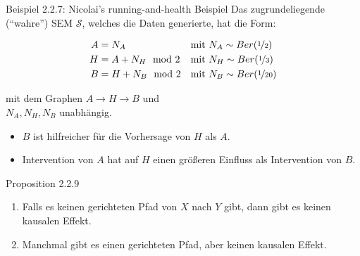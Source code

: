 \begin{frame}{Beispiel 2.2.7: Nicolai's running-and-health Beispiel}
    Das zugrundeliegende (\enquote{wahre}) SEM $\mathcal{S}$, welches die Daten
    generierte, hat die Form:

    \begin{align}
        A &= N_A            &&\text{mit } N_A \sim Ber(\nicefrac{1}{2})\\
        H &= A + N_H \mod 2 &&\text{mit } N_H \sim Ber(\nicefrac{1}{3})\\
        B &= H + N_B \mod 2 &&\text{mit } N_B \sim Ber(\nicefrac{1}{20})
    \end{align}

    mit dem Graphen $A \rightarrow H \rightarrow B$ und\\
    $N_A, N_H, N_B$ unabhängig.

    \begin{itemize}
        \item<1->  $B$ ist hilfreicher für die Vorhersage von $H$ als $A$.
        \item<2->  Intervention von $A$ hat auf $H$ einen größeren Einfluss als Intervention von $B$.
    \end{itemize}
\end{frame}

\begin{frame}{Proposition 2.2.9}
    \begin{enumerate}[label=(\roman*)]
        \item<1-> Falls es keinen gerichteten Pfad von $X$ nach $Y$ gibt, dann
                  gibt es keinen kausalen Effekt.
        \item<2-> Manchmal gibt es einen gerichteten Pfad, aber keinen kausalen
                  Effekt.
    \end{enumerate}

\end{frame}

